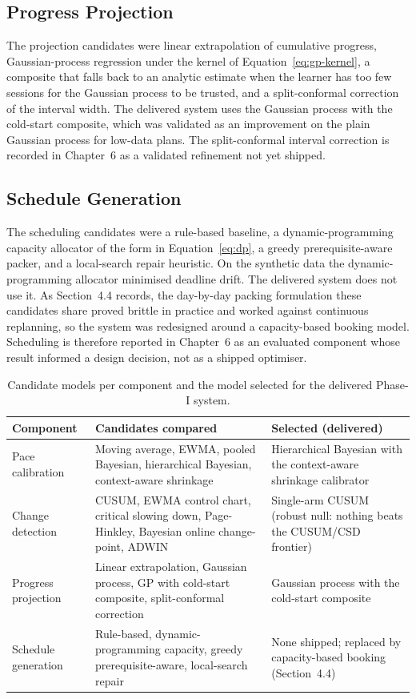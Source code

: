 \subsection{Progress Projection}
The projection candidates were linear extrapolation of cumulative progress, Gaussian-process regression under the kernel of Equation~\eqref{eq:gp-kernel}, a composite that falls back to an analytic estimate when the learner has too few sessions for the Gaussian process to be trusted, and a split-conformal correction of the interval width. The delivered system uses the Gaussian process with the cold-start composite, which was validated as an improvement on the plain Gaussian process for low-data plans. The split-conformal interval correction is recorded in Chapter~6 as a validated refinement not yet shipped.

\subsection{Schedule Generation}
The scheduling candidates were a rule-based baseline, a dynamic-programming capacity allocator of the form in Equation~\eqref{eq:dp}, a greedy prerequisite-aware packer, and a local-search repair heuristic. On the synthetic data the dynamic-programming allocator minimised deadline drift. The delivered system does not use it. As Section~4.4 records, the day-by-day packing formulation these candidates share proved brittle in practice and worked against continuous replanning, so the system was redesigned around a capacity-based booking model. Scheduling is therefore reported in Chapter~6 as an evaluated component whose result informed a design decision, not as a shipped optimiser.

\begin{table}[htbp]
\centering
\footnotesize
\caption{Candidate models per component and the model selected for the delivered Phase-I system.}
\label{tab:candidates}
\begin{tabular}{p{2.6cm} p{6.2cm} p{3.4cm}}
\toprule
\textbf{Component} & \textbf{Candidates compared} & \textbf{Selected (delivered)} \\
\midrule
Pace calibration & Moving average, EWMA, pooled Bayesian, hierarchical Bayesian, context-aware shrinkage & Hierarchical Bayesian with the context-aware shrinkage calibrator \\
Change detection & CUSUM, EWMA control chart, critical slowing down, Page-Hinkley, Bayesian online change-point, ADWIN & Single-arm CUSUM (robust null: nothing beats the CUSUM/CSD frontier) \\
Progress projection & Linear extrapolation, Gaussian process, GP with cold-start composite, split-conformal correction & Gaussian process with the cold-start composite \\
Schedule generation & Rule-based, dynamic-programming capacity, greedy prerequisite-aware, local-search repair & None shipped; replaced by capacity-based booking (Section~4.4) \\
\bottomrule
\end{tabular}
\end{table}

